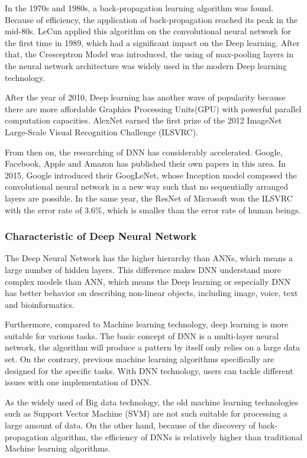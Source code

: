 \documentclass[article]{aaltoseries}
\begin{document}
In the 1970s and 1980s, a back-propagation learning algorithm was found. Because of efficiency, the application of back-propagation
reached its peak in the mid-80s. LeCun applied this algorithm on the convolutional neural network 
for the first time in 1989, which had a significant impact on the Deep learning. After that, the Cresceptron Model was introduced, 
the using of max-pooling layers in the neural network architecture was widely used in the modern Deep learning technology.

After the year of 2010, Deep learning has another wave of popularity because there are more affordable Graphics Processing Units(GPU)
 with powerful parallel computation capacities. AlexNet\cite{NIPS2012_4824} earned the first prize of 
the 2012 ImageNet Large-Scale Visual Recognition Challenge (ILSVRC). 

From then on, the researching of DNN has considerably accelerated. Google, Facebook, Apple and Amazon has published
their own papers in this area. In 2015, Google introduced their GoogLeNet\cite{GoogLeNet}, whose Inception model composed the convolutional 
neural network in a new way such that no sequentially arranged layers are possible. In the same year, the ResNet\cite{ResNet} of Microsoft won 
the ILSVRC with the error rate of 3.6\%, which is smaller than the error rate of human beings.




\subsubsection{Characteristic of Deep Neural Network}

The Deep Neural Network has the higher hierarchy than ANNs, which means a large number of hidden layers\cite{MAL-006}. 
This difference makes DNN understand more complex models than ANN, which means the Deep learning or especially DNN
has better behavior on describing non-linear objects, including image, voice, text and bioinformatics.

Furthermore, compared to Machine learning technology, deep learning is more suitable for various tasks. The basic concept
of DNN is a multi-layer neural network, the algorithm will produce a pattern by itself only relies on a large data set.
On the contrary, previous machine learning algorithms specifically are designed for the specific tasks. 
With DNN technology, users can tackle different issues with one implementation of DNN. 

As the widely used of Big data technology, the old machine learning technologies such as Support Vector Machine (SVM) are
not such suitable for processing a large amount of data. On the other hand, because of the discovery of back-propagation
algorithm, the efficiency of DNNs is relatively higher than traditional Machine learning algorithms.
\end{document}
